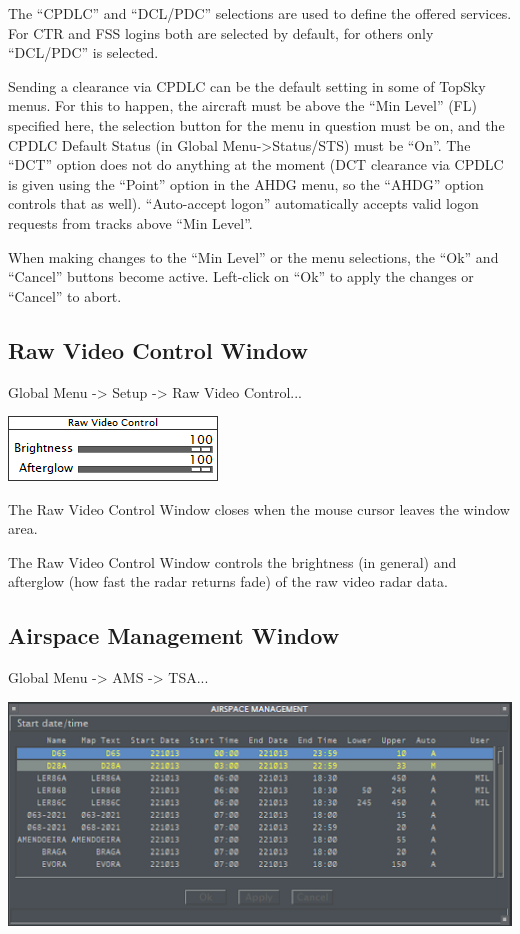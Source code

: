 \documentclass[11pt,a4paper]{memoir}
\begin{document}
The “CPDLC” and “DCL/PDC” selections are used to define the offered services. For CTR and FSS logins both are selected by default, for others only “DCL/PDC” is selected.

Sending a clearance via CPDLC can be the default setting in some of TopSky menus. For this to happen, the aircraft must be above the “Min Level” (FL) specified here, the selection button for the menu in question must be on, and the CPDLC Default Status (in Global Menu->Status/STS) must be “On”. The “DCT” option does not do anything at the moment (DCT clearance via CPDLC is given using the “Point” option in the AHDG menu, so the “AHDG” option controls that as well). “Auto-accept logon” automatically accepts valid logon requests from tracks above “Min Level”.

When making changes to the “Min Level” or the menu selections, the “Ok” and “Cancel” buttons become active. Left-click on “Ok” to apply the changes or “Cancel” to abort.

\subsection{Raw Video Control Window}
\label{win:rvcw}

Global Menu -> Setup -> Raw Video Control...

\includegraphics{img/rawvideo.png}

The Raw Video Control Window closes when the mouse cursor leaves the window area.

The Raw Video Control Window controls the brightness (in general) and afterglow (how fast the radar returns fade) of the raw video radar data.

\subsection{Airspace Management Window}
\label{win:amw}

Global Menu -> AMS -> TSA...

\includegraphics{img/tsa.png}
\end{document}
